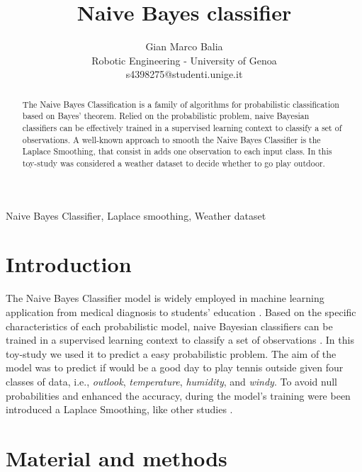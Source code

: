 \documentclass[9pt,technote]{IEEEtran}
\title{Naive Bayes classifier}
\author{
	Gian Marco Balia\\
	Robotic Engineering - University of Genoa\\
	s4398275@studenti.unige.it
}
\begin{document}
\maketitle

\begin{abstract}
The Naive Bayes Classification is a family of algorithms for probabilistic classification based on Bayes’ theorem. Relied on the probabilistic problem, naive Bayesian classifiers can be effectively trained in a supervised learning context to classify a set of observations.
A well-known approach to smooth the Naive Bayes Classifier is the Laplace Smoothing, that consist in adds one observation to each input class.
In this toy-study was considered a weather dataset to decide whether to go play outdoor.
\end{abstract}


\begin{IEEEkeywords}
Naive Bayes Classifier, Laplace smoothing, Weather dataset 
\end{IEEEkeywords}

\section{Introduction}
The Naive Bayes Classifier model is widely employed \cite{wickramasinghe2021NaiveBayesApplicationsa} in machine learning application from medical diagnosis \cite{al2012medical} to students' education \cite{nafea2018machine}. Based on the specific characteristics of each probabilistic model, naive Bayesian classifiers can be trained in a supervised learning context to classify a set of observations \cite{derbel2020automatic}. In this toy-study we used it to predict a easy probabilistic problem. The aim of the model was to predict if would be a good day to play tennis outside given four classes of data, i.e., \textit{outlook}, \textit{temperature}, \textit{humidity}, and \textit{windy}.
To avoid null probabilities and enhanced the accuracy, during the model's training were been introduced a Laplace Smoothing, like other studies \cite{narayan2023EarlyPredictionHeart, sabiq2024PerformanceComparisonMultinomial}.

\section{Material and methods}
\end{document}
